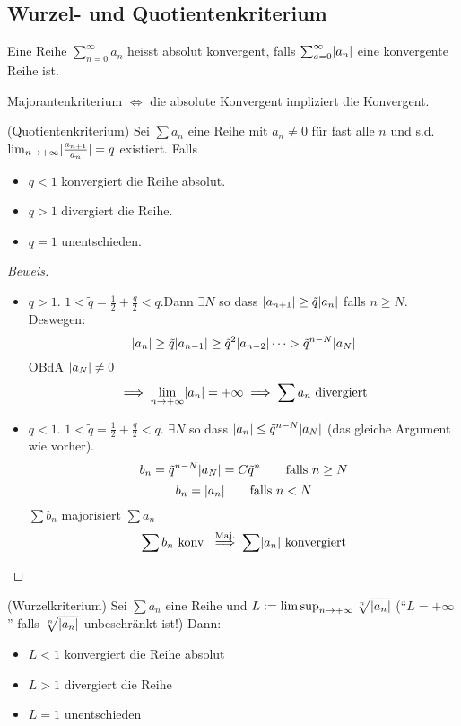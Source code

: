 \subsection{Wurzel- und Quotientenkriterium}
\begin{Def}
  Eine Reihe $\sum^\infty_{n=0} a_n$ heisst \ul{absolut konvergent}, falls $\sum_{a=0}^\infty \mathopen| a_n \mathclose|$ eine konvergente Reihe ist.
\end{Def}
\begin{Bem}
  Majorantenkriterium $\iff$ die absolute Konvergent impliziert die Konvergent.
\end{Bem}
\begin{Sat} (Quotientenkriterium)
  Sei $\sum a_n$ eine Reihe mit $a_n\neq 0$ für fast alle $n$ und s.d. $\lim_{n\to+\infty}\mathopen| \frac{a_{n+1}}{a_n} \mathclose|=q$ existiert. Falls
  \begin{itemize}
    \item $q<1$ konvergiert die Reihe absolut.
    \item $q>1$ divergiert die Reihe.
    \item $q=1$ unentschieden.
  \end{itemize}
\end{Sat}
\begin{proof}[Beweis]
  \begin{itemize}
    \item $q>1$. $1<\tilde q=\frac{1}{2}+\frac{q}{2}<q$.Dann $\exists N$ so dass $\mathopen| a_{n+1} \mathclose|\geq \tilde q\mathopen| a_n \mathclose|$ 
falls $n\geq N$. Deswegen:
      \[\mathopen| a_n \mathclose|\geq \tilde q\mathopen| a_{n-1} \mathclose|\geq \tilde{q}^2\mathopen| a_{n-2} \mathclose|\cdots>\tilde{q}^{n-N}\mathopen| a_N \mathclose|\]
      OBdA $\mathopen| a_N \mathclose|\neq 0$
      \[\implies \lim_{n\to+\infty}\mathopen| a_n \mathclose|=+\infty\implies\sum a_n\text{ divergiert}\]
    \item $q<1$. $1<\tilde q=\frac{1}{2}+\frac{q}{2}<q$. $\exists N$ so dass $\mathopen| a_n \mathclose|\leq \tilde{q}^{n-N}\mathopen| a_N \mathclose|$ (das gleiche Argument wie vorher).
      \[b_n=\tilde{q}^{n-N}\mathopen| a_N \mathclose|=C\tilde{q}^n \qquad \mbox{falls $n\geq N$}\]
      \[b_n=\mathopen| a_n \mathclose| \qquad \mbox{falls $n<N$}\]
      $\sum b_n$ majorisiert $\sum a_n$
      \[\sum b_n \text{ konv }\stackrel{\text{Maj.}}{\implies}\sum\mathopen| a_n \mathclose| \text{ konvergiert}\]
  \end{itemize}
\end{proof}
\begin{Sat} (Wurzelkriterium)
  Sei $\sum a_n$ eine Reihe und $L:=\limsup_{n\to+\infty}\sqrt[n]{\mathopen| a_n \mathclose|}$ 
(``$L=+\infty$'' falls $\sqrt[n]{\mathopen| a_n \mathclose|}$ unbeschränkt ist!) Dann:
  \begin{itemize}
    \item $L<1$ konvergiert die Reihe absolut
    \item $L>1$ divergiert die Reihe
    \item $L=1$ unentschieden
  \end{itemize}
\end{Sat}

